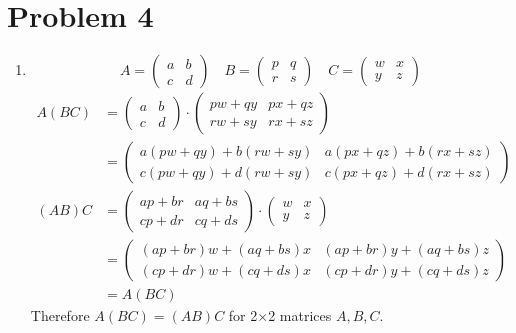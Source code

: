 \documentclass[a4paper,12pt]{extarticle}
\theoremstyle{definition}
\begin{document}
    \section*{Problem 4}\begin{enumerate}[label=(\alph*)]
        \item $$A=\begin{pmatrix}a & b \\c & d\end{pmatrix}\quad B=\begin{pmatrix}p & q \\r & s\end{pmatrix}\quad C=\begin{pmatrix}w & x\\y & z\end{pmatrix}$$
        \begin{align*}
            A(BC)&=\begin{pmatrix}a & b \\c & d\end{pmatrix}\cdot\begin{pmatrix}pw+qy&px+qz\\ rw+sy&rx+sz\end{pmatrix}\\
        &=\begin{pmatrix}a\left(pw+qy\right)+b\left(rw+sy\right)&a\left(px+qz\right)+b\left(rx+sz\right)\\ c\left(pw+qy\right)+d\left(rw+sy\right)&c\left(px+qz\right)+d\left(rx+sz\right)\end{pmatrix}\\
        (AB)C&=\begin{pmatrix}ap+br&aq+bs\\ cp+dr&cq+ds\end{pmatrix}\cdot\begin{pmatrix}
            w & x\\
             y & z
        \end{pmatrix}\\
        &=\begin{pmatrix}\left(ap+br\right)w+\left(aq+bs\right)x&\left(ap+br\right)y+\left(aq+bs\right)z\\ \left(cp+dr\right)w+\left(cq+ds\right)x&\left(cp+dr\right)y+\left(cq+ds\right)z\end{pmatrix}\\
        &=A(BC)
        \end{align*} Therefore $A(BC)=(AB)C$ for 2$\times$2 matrices $A,B,C$.

\end{enumerate}
\end{document}
